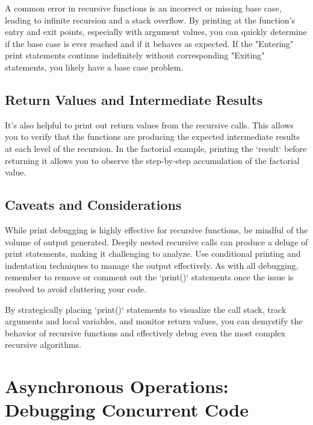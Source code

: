 \documentclass{article}
\begin{document}
{{{A common error in recursive functions is an incorrect or missing base case, leading to infinite recursion and a stack overflow. By printing at the function's entry and exit points, especially with argument values, you can quickly determine if the base case is ever reached and if it behaves as expected.  If the "Entering" print statements continue indefinitely without corresponding "Exiting" statements, you likely have a base case problem.

\subsection*{Return Values and Intermediate Results}

It’s also helpful to print out return values from the recursive calls. This allows you to verify that the functions are producing the expected intermediate results at each level of the recursion. In the factorial example, printing the `result` before returning it allows you to observe the step-by-step accumulation of the factorial value.

\subsection*{Caveats and Considerations}

While print debugging is highly effective for recursive functions, be mindful of the volume of output generated. Deeply nested recursive calls can produce a deluge of print statements, making it challenging to analyze. Use conditional printing and indentation techniques to manage the output effectively. As with all debugging, remember to remove or comment out the `print()` statements once the issue is resolved to avoid cluttering your code.

By strategically placing `print()` statements to visualize the call stack, track arguments and local variables, and monitor return values, you can demystify the behavior of recursive functions and effectively debug even the most complex recursive algorithms.

\newpage

\section*{Asynchronous Operations: Debugging Concurrent Code} %
\label{chapter-3-8-Asynchronous_Operations__Debugging_Concu}

}}}
\end{document}
